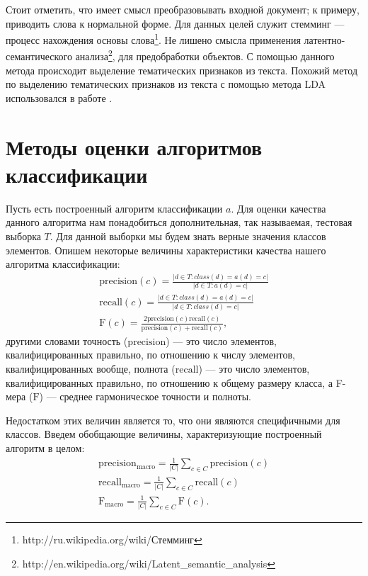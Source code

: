 Стоит отметить, что имеет смысл преобразовывать входной документ; к примеру, приводить слова к нормальной форме. Для данных целей служит стемминг --- процесс нахождения основы слова\footnote{http://ru.wikipedia.org/wiki/Стемминг}. Не лишено смысла применения латентно-семантического анализа\footnote{http://en.wikipedia.org/wiki/Latent\_semantic\_analysis}, для предобработки объектов. С помощью данного метода происходит выделение тематических признаков из текста. Похожий метод по выделению тематических признаков из текста с помощью метода LDA использовался в работе \cite{ramage2010characterizing}.


\section{Методы оценки алгоритмов классификации}
Пусть есть построенный алгоритм классификации $a$. Для оценки качества данного алгоритма нам понадобиться дополнительная, так называемая, тестовая выборка $T$. Для данной выборки мы будем знать верные значения классов элементов. Опишем некоторые величины характеристики качества нашего алгоритма классификации: \begin{gather}
\mathrm{precision}(c) = \frac{|d \in T \colon class(d) = a(d) = c|}{|d \in T \colon a(d) = c|} \\
\mathrm{recall}(c) = \frac{|d \in T \colon class(d) = a(d) = c|}{|d \in T \colon class(d) = c|} \\
\mathrm{F}(c) = \frac{2 \mathrm{precision}(c) \mathrm{recall}(c)}{\mathrm{precision}(c) + \mathrm{recall}(c)},
\end{gather}
другими словами точность ($\mathrm{precision}$) --- это число элементов, квалифицированных правильно, по отношению к числу элементов, квалифицированных вообще, полнота ($\mathrm{recall}$) --- это число элементов, квалифицированных правильно, по отношению к общему размеру класса, а F-мера ($\mathrm{F}$) --- среднее гармоническое точности и полноты.

Недостатком этих величин является то, что они являются специфичными для классов. Введем обобщающие величины, характеризующие построенный алгоритм в целом: \begin{gather}
\mathrm{precision_{macro}} = \frac{1}{|C|} \sum_{c \in C} \mathrm{precision}(c) \\
\mathrm{recall_{macro}} = \frac{1}{|C|} \sum_{c \in C} \mathrm{recall}(c) \\
\mathrm{F_{macro}} = \frac{1}{|C|} \sum_{c \in C} \mathrm{F}(c).
\end{gather}


